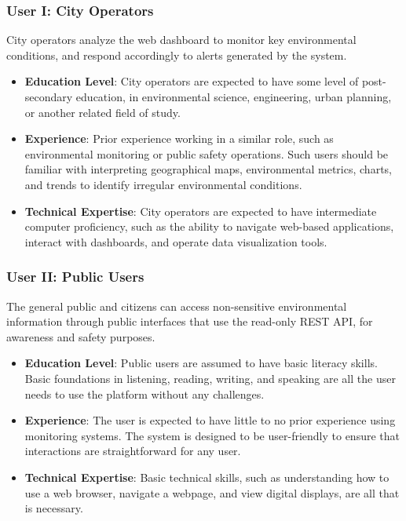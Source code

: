 \documentclass[]{article}
\begin{document}
\subsubsection{User I: City Operators}
City operators analyze the web dashboard to monitor key environmental conditions, and respond accordingly to alerts generated by the system.
\begin{itemize}
    \item \textbf{Education Level}: City operators are expected to have some level of post-secondary education, in environmental science, engineering, urban planning, or another related field of study.
    \item \textbf{Experience}: Prior experience working in a similar role, such as environmental monitoring or public safety operations. Such users should be familiar with interpreting geographical maps, environmental metrics, charts, and trends to identify irregular environmental conditions.
    \item \textbf{Technical Expertise}: City operators are expected to have intermediate computer proficiency, such as the ability to navigate web-based applications, interact with dashboards, and operate data visualization tools.
\end{itemize}

\subsubsection{User II: Public Users}
The general public and citizens can access non-sensitive environmental information through public interfaces that use the read-only REST API, for awareness and safety purposes.
\begin{itemize}
    \item \textbf{Education Level}: Public users are assumed to have basic literacy skills. Basic foundations in listening, reading, writing, and speaking are all the user needs to use the platform without any challenges.
    \item \textbf{Experience}: The user is expected to have little to no prior experience using monitoring systems. The system is designed to be user-friendly to ensure that interactions are straightforward for any user.
    \item \textbf{Technical Expertise}: Basic technical skills, such as understanding how to use a web browser, navigate a webpage, and view digital displays, are all that is necessary.
\end{itemize}
\end{document}
